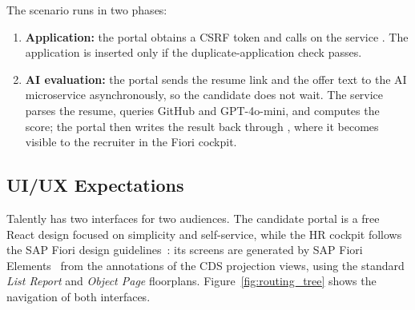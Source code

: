 The scenario runs in two phases:

\begin{enumerate}
    \item \textbf{Application:} the portal obtains a CSRF token and calls  on the service . The application is inserted only if the duplicate-application check passes.
    \item \textbf{AI evaluation:} the portal sends the resume link and the offer text to the AI microservice asynchronously, so the candidate does not wait. The service parses the resume, queries GitHub and GPT-4o-mini, and computes the score; the portal then writes the result back through , where it becomes visible to the recruiter in the Fiori cockpit.
\end{enumerate}

\subsection{UI/UX Expectations}
\label{subsec:uiux}

Talently has two interfaces for two audiences. The candidate portal is a free React design focused on simplicity and self-service, while the HR cockpit follows the SAP Fiori design guidelines~\cite{sap_fiori_design}: its screens are generated by SAP Fiori Elements~\cite{sap_fiori_elements} from the annotations of the CDS projection views, using the standard \emph{List Report} and \emph{Object Page} floorplans. Figure~\ref{fig:routing_tree} shows the navigation of both interfaces.

